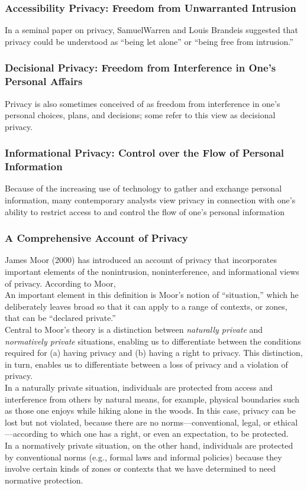 \documentclass[12pt]{article}
\theoremstyle{definition}
\begin{document}
\subsubsection{Accessibility Privacy: Freedom from Unwarranted Intrusion}
In a seminal paper on privacy, SamuelWarren and Louis Brandeis suggested that privacy could be understood as “being let alone” or “being free from intrusion.”
\subsubsection{Decisional Privacy: Freedom from Interference in One's Personal Affairs}
Privacy is also sometimes conceived of as freedom from interference in one’s personal choices, plans, and decisions; some refer to this view as decisional privacy.
\subsubsection{Informational Privacy: Control over the Flow of Personal Information}
Because of the increasing use of technology to gather and exchange personal information, many contemporary analysts view privacy in connection with one’s ability to restrict access to and control the flow of one’s personal information
\subsubsection{A Comprehensive Account of Privacy}
James Moor (2000) has introduced an account of privacy that incorporates important elements of the nonintrusion, noninterference, and informational views of privacy. According to Moor,
\\
An important element in this definition is Moor’s notion of “situation,” which he deliberately leaves broad so that it can apply to a range of contexts, or zones, that can be “declared private.”\\
Central to Moor’s theory is a distinction between \textit{naturally private} and \textit{normatively private} situations, enabling us to differentiate between the conditions required for (a) having privacy and (b) having a right to privacy. This distinction, in turn, enables us to differentiate between a loss of privacy and a violation of privacy.\\
In a naturally
private situation, individuals are protected from access and interference from others by natural means, for example, physical boundaries such as those one enjoys while hiking alone in the woods. In this case, privacy can be lost but not violated, because there are no norms—conventional, legal, or ethical—according to which one has a right, or even an
expectation, to be protected.\\
In a normatively private situation, on the other hand, individuals are protected by conventional norms (e.g., formal laws and informal policies) because they involve certain kinds of zones or contexts that we have determined to need normative protection.
\end{document}
